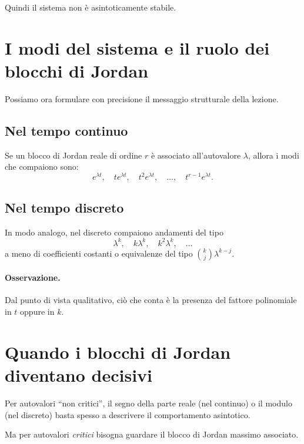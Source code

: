 Quindi il sistema non è asintoticamente stabile.

\section{I modi del sistema e il ruolo dei blocchi di Jordan}

Possiamo ora formulare con precisione il messaggio strutturale della lezione.

\subsection{Nel tempo continuo}

Se un blocco di Jordan reale di ordine $r$ è associato all'autovalore $\lambda$, allora i modi che compaiono sono:
\begin{equation}
e^{\lambda t},\quad
te^{\lambda t},\quad
t^2 e^{\lambda t},\quad
\dots,\quad
t^{r-1}e^{\lambda t}.
\label{eq:L8_modes_CT}
\end{equation}

\subsection{Nel tempo discreto}

In modo analogo, nel discreto compaiono andamenti del tipo
\begin{equation}
\lambda^k,\quad
k\lambda^k,\quad
k^2\lambda^k,\quad
\dots
\label{eq:L8_modes_DT}
\end{equation}
a meno di coefficienti costanti o equivalenze del tipo $\binom{k}{j}\lambda^{k-j}$.

\paragraph{Osservazione.}
Dal punto di vista qualitativo, ciò che conta è la presenza del fattore polinomiale in $t$ oppure in $k$.

\section{Quando i blocchi di Jordan diventano decisivi}

Per autovalori ``non critici'', il segno della parte reale (nel continuo) o il modulo (nel discreto) basta spesso a descrivere il comportamento asintotico.

Ma per autovalori \emph{critici} bisogna guardare il blocco di Jordan massimo associato.

